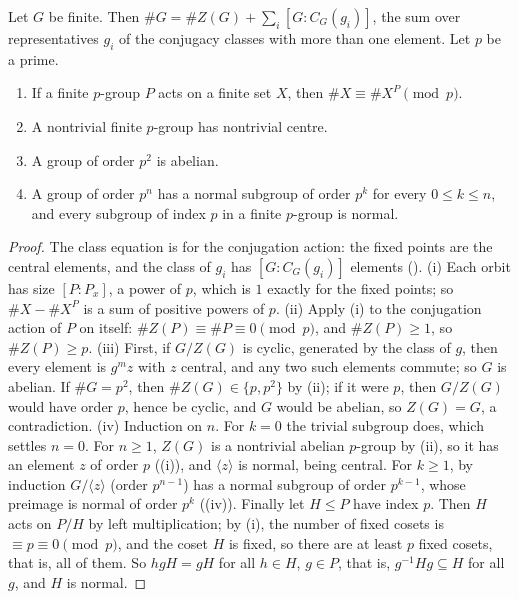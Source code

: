 \begin{theorem}\label{thm:groups:classeq}
Let $G$ be finite. Then $\#G=\#Z(G)+\sum_i[G:C_G(g_i)]$, the sum over representatives $g_i$ of the conjugacy classes with more than one element.
Let $p$ be a prime.
\begin{enumerate}[label=(\roman*)]
\item If a finite $p$-group $P$ acts on a finite set $X$, then $\#X\equiv\#X^P\pmod p$.
\item A nontrivial finite $p$-group has nontrivial centre.
\item A group of order $p^2$ is abelian.
\item A group of order $p^n$ has a normal subgroup of order $p^k$ for every $0\le k\le n$, and every subgroup of index $p$ in a finite $p$-group is normal.
\end{enumerate}
\end{theorem}

\begin{proof}
The class equation is  for the conjugation action: the fixed points are the central elements, and the class of $g_i$ has
$[G:C_G(g_i)]$ elements (). (i) Each orbit has size $[P:P_x]$, a power of $p$, which is $1$ exactly for the fixed points; so
$\#X-\#X^P$ is a sum of positive powers of $p$. (ii) Apply (i) to the conjugation action of $P$ on itself: $\#Z(P)\equiv\#P\equiv0\pmod p$, and
$\#Z(P)\ge1$, so $\#Z(P)\ge p$. (iii) First, if $G/Z(G)$ is cyclic, generated by the class of $g$, then every element is $g^mz$ with $z$ central, and
any two such elements commute; so $G$ is abelian. If $\#G=p^2$, then $\#Z(G)\in\{p,p^2\}$ by (ii); if it were $p$, then $G/Z(G)$ would have order $p$,
hence be cyclic, and $G$ would be abelian, so $Z(G)=G$, a contradiction. (iv) Induction on $n$. For $k=0$ the trivial subgroup does, which settles
$n=0$. For $n\ge1$, $Z(G)$ is a nontrivial abelian $p$-group by (ii), so it has an element $z$ of order $p$ ((i)), and $\langle z\rangle$ is
normal, being central. For $k\ge1$, by induction $G/\langle z\rangle$ (order $p^{n-1}$) has a normal subgroup of order $p^{k-1}$, whose preimage is normal of order $p^k$
((iv)). Finally let $H\le P$ have index $p$. Then $H$ acts on $P/H$ by left multiplication; by (i), the number of fixed cosets is
$\equiv p\equiv0\pmod p$, and the coset $H$ is fixed, so there are at least $p$ fixed cosets, that is, all of them. So $hgH=gH$ for all $h\in H$, $g\in P$, that
is, $g^{-1}Hg\subseteq H$ for all $g$, and $H$ is normal.
\end{proof}

